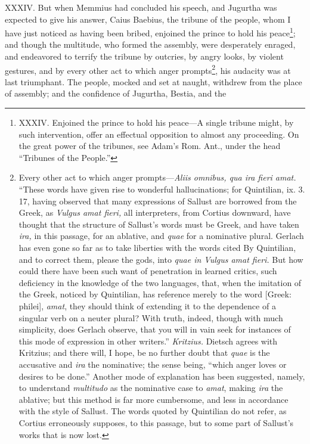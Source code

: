 XXXIV. But when Memmius had concluded his speech, and Jugurtha was
expected to give his answer, Caius Baebius, the tribune of the people,
whom I have just noticed as having been bribed, enjoined the prince to
hold his peace\footnote{XXXIV. Enjoined the prince to hold his peace—A single tribune
might, by such intervention, offer an effectual opposition to almost
any proceeding. On the great power of the tribunes, see Adam's Rom.
Ant., under the head ``Tribunes of the People.''}; and though the multitude, who formed the
assembly, were desperately enraged, and endeavored to terrify the
tribune by outcries, by angry looks, by violent gestures, and by every
other act to which anger prompts\footnote{Every other act to which anger prompts—\emph{Aliis omnibus, qua
ira fieri amat.} ``These words have given rise to wonderful
hallucinations; for Quintilian, ix. 3. 17, having observed that many
expressions of Sallust are borrowed from the Greek, as \emph{Vulgus amat
fieri,} all interpreters, from Cortius downward, have thought that the
structure of Sallust's words must be Greek, and have taken \emph{ira,} in
this passage, for an ablative, and \emph{quae} for a nominative plural.
Gerlach has even gone so far as to take liberties with the words cited
By Quintilian, and to correct them, please the gods, into \emph{quae in
Vulgus amat fieri.} But how could there have been such want of
penetration in learned critics, such deficiency in the knowledge of
the two languages, that, when the imitation of the Greek, noticed by
Quintilian, has reference merely to the word [Greek: philei], \emph{amat},
they should think of extending it to the dependence of a singular verb
on a neuter plural? With truth, indeed, though with much simplicity,
does Gerlach observe, that you will in vain seek for instances of this
mode of expression in other writers.'' \emph{Kritzius.} Dietsch agrees with
Kritzius; and there will, I hope, be no further doubt that \emph{quae} is
the accusative and \emph{ira} the nominative; the sense being, ``which anger
loves or desires to be done.'' Another mode of explanation has been
suggested, namely, to understand \emph{multitudo} as the nominative case to
\emph{amat}, making \emph{ira} the ablative; but this method is far more
cumbersome, and less in accordance with the style of Sallust. The
words quoted by Quintilian do not refer, as Cortius erroneously
supposes, to this passage, but to some part of Sallust's works that is
now lost.}, his audacity was at last
triumphant. The people, mocked and set at naught, withdrew from the
place of assembly; and the confidence of Jugurtha, Bestia, and the
